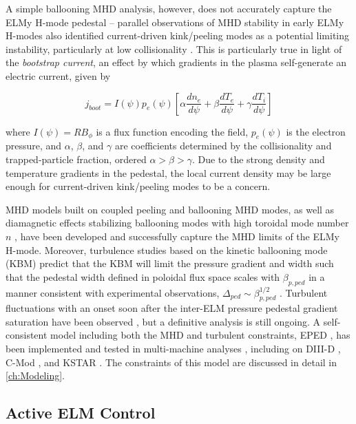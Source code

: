 A simple ballooning MHD analysis, however, does not accurately capture the ELMy H-mode pedestal -- parallel observations of MHD stability in early ELMy H-modes also identified current-driven kink/peeling modes as a potential limiting instability, particularly at low collisionality \cite{Connor1998,Suttrop2000,Groebner1998a}.  This is particularly true in light of the \emph{bootstrap current}, an effect by which gradients in the plasma self-generate an electric current, given by \cite{Sauter1999}

\begin{equation}\label{eq:jboot}
 j_{boot} = I(\psi) p_e(\psi) \left[ \alpha \frac{dn_e}{d\psi} + \beta \frac{dT_e}{d\psi} + \gamma \frac{dT_i}{d\psi}\right]
\end{equation}

\noindent where $I(\psi) = RB_\phi$ is a flux function encoding the field, $p_e(\psi)$ is the electron pressure, and $\alpha$, $\beta$, and $\gamma$ are coefficients determined by the collisionality and trapped-particle fraction, ordered $\alpha > \beta > \gamma$.  Due to the strong density and temperature gradients in the pedestal, the local current density may be large enough for current-driven kink/peeling modes to be a concern.  

MHD models built on coupled peeling and ballooning MHD modes, as well as diamagnetic effects stabilizing ballooning modes with high toroidal mode number $n$ \cite{Suttrop2000}, have been developed \cite{Snyder2002,Turnbull2003} and successfully capture the MHD limits of the ELMy H-mode.  Moreover, turbulence studies based on the kinetic ballooning mode (KBM) \cite{Tang1980} predict that the KBM will limit the pressure gradient and width such that the pedestal width defined in poloidal flux space scales with $\beta_{p,ped}$ in a manner consistent with experimental observations, $\Delta_{ped} \sim \beta_{p,ped}^{1/2}$ \cite{Snyder2001}.  Turbulent fluctuations with an onset soon after the inter-ELM pressure pedestal gradient saturation have been observed \cite{Diallo2014}, but a definitive analysis is still ongoing.  A self-consistent model including both the MHD and turbulent constraints, EPED \cite{Snyder2009}, has been implemented and tested in multi-machine analyses \cite{Groebner2013}, including on DIII-D \cite{Snyder2012}, C-Mod \cite{Walk2012}, and KSTAR \cite{Han2013}.  The constraints of this model are discussed in detail in \cref{ch:Modeling}.

\subsection{Active ELM Control}\label{subsec:hcr_elmy_control}

